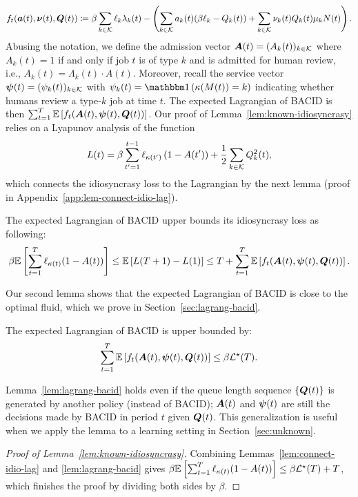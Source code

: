 \begin{equation}\label{eq:per-period-lag}
f_t(\boldsymbol{a}(t), \boldsymbol{\nu}(t), \boldsymbol{Q}(t)) \coloneqq \beta \sum_{k \in \mathcal{K}} \ell_k\lambda_k(t) - \left(\sum_{k \in \mathcal{K}} a_k(t)(\beta \ell_k - Q_k(t)) + \sum_{k \in \mathcal{K}} \nu_k(t) Q_k(t)\mu_kN(t)\right).
\end{equation}
Abusing the notation, we define the admission vector $\boldsymbol{A}(t) = (A_k(t))_{k \in \mathcal{K}}$ where $A_k(t) = 1$ if and only if job $t$ is of type $k$ and is admitted for human review, i.e., $A_k(t) = \Lambda_k(t) \cdot A(t)$. Moreover, recall the service vector $\boldsymbol{\psi}(t) = (\psi_k(t))_{k \in \mathcal{K}}$ with $\psi_k(t) = \indic{\kappa(M(t))= k}$ indicating whether humans review a type-$k$ job at time $t$. The expected Lagrangian of
\textsc{BACID} is then $\sum_{t=1}^T \mathbb E\left[f_t(\boldsymbol{A}(t), \boldsymbol{\psi}(t), \boldsymbol{Q}(t))\right]$. Our proof of Lemma~\ref{lem:known-idiosyncrasy} relies on a Lyapunov analysis of the function 
\[L(t) = \beta\sum_{t'=1}^{t-1} \ell_{\kappa(t')}\left(1 - A(t')\right) + \frac{1}{2}\sum_{k \in \mathcal{K}} Q_k^2(t),\]
which connects the idiosyncrasy loss to the Lagrangian by the next lemma (proof in Appendix~\ref{app:lem-connect-idio-lag}).
\begin{lemma}\label{lem:connect-idio-lag}
The expected Lagrangian of \textsc{BACID} upper bounds its idiosyncrasy loss as following:
\[
\beta \mathbb E\left[\sum_{t=1}^{T} \ell_{\kappa(t)}(1-A(t))\right] \leq \mathbb E\left[L(T+1)-L(1)\right] \leq T + \sum_{t=1}^T \mathbb E\left[f_t(\boldsymbol{A}(t), \boldsymbol{\psi}(t), \boldsymbol{Q}(t))\right].
\]
\end{lemma}
Our second lemma shows that the expected Lagrangian of \textsc{BACID} is close to the optimal fluid, which we prove in Section~\ref{sec:lagrang-bacid}. 
\begin{lemma}\label{lem:lagrang-bacid}
The expected Lagrangian of \textsc{BACID} is upper bounded by:
\[
\sum_{t=1}^T \mathbb E\left[f_t(\boldsymbol{A}(t), \boldsymbol{\psi}(t), \boldsymbol{Q}(t))\right]  \leq \beta \mathcal{L}^\star(T).
\]
\end{lemma}
\begin{remark}
Lemma~\ref{lem:lagrang-bacid} holds even if the queue length sequence $\{\boldsymbol{Q}(t)\}$ is generated by another policy (instead of \textsc{BACID}); $\boldsymbol{A}(t)$ and $\boldsymbol{\psi}(t)$ are still the decisions made by \textsc{BACID} in period $t$ given $\boldsymbol{Q}(t)$. This generalization is useful when we apply the lemma to a learning setting in Section~\ref{sec:unknown}.
\end{remark}
\begin{proof}[Proof of Lemma~\ref{lem:known-idiosyncrasy}]
Combining Lemmas~\ref{lem:connect-idio-lag} and \ref{lem:lagrang-bacid} gives $\beta \mathbb E\left[\sum_{t=1}^{T} \ell_{\kappa(t)}(1-A(t))\right] \leq \beta \mathcal{L}^\star(T) + T$, which finishes the proof by dividing both sides by $\beta$.
\end{proof}

